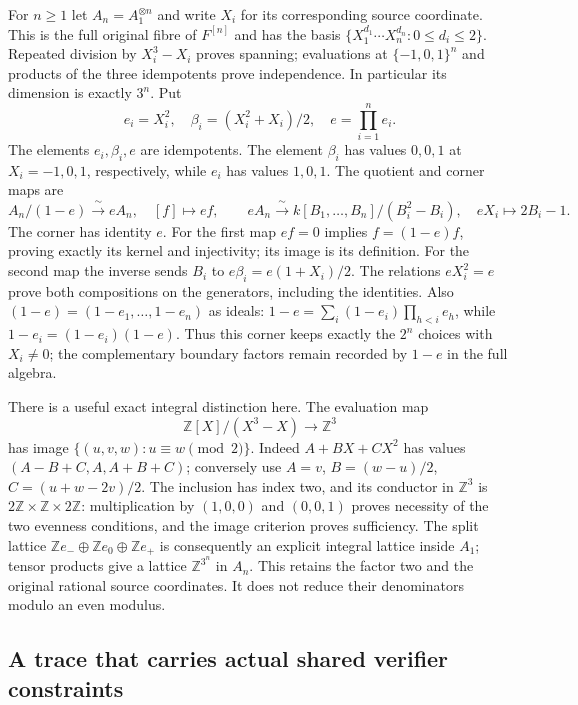 For $n\ge1$ let $A_n=A_1^{\otimes n}$ and write $X_i$ for its
corresponding source coordinate. This is the full original fibre of
$F^{[n]}$ and has the basis
$\{X_1^{d_1}\cdots X_n^{d_n}:0\le d_i\le2\}$.
Repeated division by $X_i^3-X_i$ proves spanning; evaluations at
$\{-1,0,1\}^n$ and products of the three idempotents prove independence.
In particular its dimension is exactly $3^n$. Put
\[
 e_i=X_i^2,\quad \beta_i=(X_i^2+X_i)/2,
 \quad e=\prod_{i=1}^n e_i.
\]
The elements $e_i,\beta_i,e$ are idempotents. The element $\beta_i$
has values $0,0,1$ at $X_i=-1,0,1$, respectively, while $e_i$
has values $1,0,1$.
The quotient and corner maps are
\[
 A_n/(1-e)\xrightarrow{\ \sim\ }eA_n,\quad [f]\longmapsto ef,
 \qquad
 eA_n\xrightarrow{\ \sim\ }k[B_1,\ldots,B_n]/(B_i^2-B_i),
 \quad eX_i\longmapsto2B_i-1.
\]
The corner has identity $e$. For the first map $ef=0$ implies
$f=(1-e)f$, proving exactly its kernel and injectivity; its image
is its definition. For the second map the inverse sends
$B_i$ to $e\beta_i=e(1+X_i)/2$. The relations $eX_i^2=e$
prove both compositions on the generators, including the identities.
Also $(1-e)=(1-e_1,\ldots,1-e_n)$ as ideals:
$1-e=\sum_i(1-e_i)\prod_{h<i}e_h$, while
$1-e_i=(1-e_i)(1-e)$. Thus this corner keeps exactly the
$2^n$ choices with $X_i\ne0$; the complementary boundary factors
remain recorded by $1-e$ in the full algebra.

There is a useful exact integral distinction here. The evaluation map
\[
 \mathbb Z[X]/(X^3-X)\longrightarrow\mathbb Z^3
\]
has image $\{(u,v,w):u\equiv w\pmod2\}$. Indeed
$A+BX+CX^2$ has values $(A-B+C,A,A+B+C)$; conversely use
$A=v$, $B=(w-u)/2$, $C=(u+w-2v)/2$.
The inclusion has index two, and its conductor in $\mathbb Z^3$ is
$2\mathbb Z\times\mathbb Z\times2\mathbb Z$: multiplication
by $(1,0,0)$ and $(0,0,1)$ proves necessity of the two evenness
conditions, and the image criterion proves sufficiency. The split
lattice $\mathbb Ze_-\oplus\mathbb Ze_0\oplus\mathbb Ze_+$
is consequently an explicit integral lattice inside $A_1$;
tensor products give a lattice $\mathbb Z^{3^n}$ in $A_n$.
This retains the factor two and the original rational source coordinates.
It does not reduce their denominators modulo an even modulus.

\subsection{A trace that carries actual shared verifier constraints}

